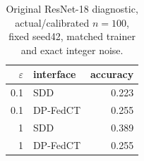 \begin{table}[t]
\centering
\caption{Original ResNet-18 diagnostic, actual/calibrated $n=100$, fixed seed42, matched trainer and exact integer noise.}
\label{tab:new-legacy}
\small\setlength{\tabcolsep}{3pt}
\begin{tabular}{@{}rlr@{}}\toprule
$\varepsilon$ & interface & accuracy \\\midrule
0.1 & SDD & 0.223 \\
0.1 & DP-FedCT & 0.255 \\
1 & SDD & 0.389 \\
1 & DP-FedCT & 0.255 \\
\bottomrule\end{tabular}
\end{table}
